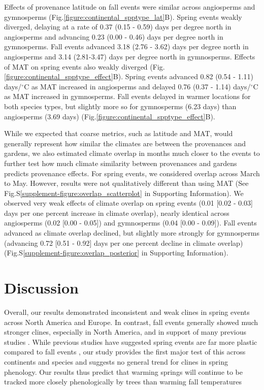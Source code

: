 \documentclass{article}
\begin{document}
Effects of provenance latitude on fall events were similar across angiosperms and gymnosperms (Fig.\ref{figure:continental_spptype_lat}B). Spring events weakly diverged, delaying at a rate of 0.37 (0.15 - 0.59) days per degree north in angiosperms and advancing 0.23 (0.00 - 0.46) days per degree north in gymnosperms. Fall events advanced 3.18 (2.76 - 3.62) days per degree north in angiosperms and 3.14 (2.81-3.47) days per degree north in gymnosperms.
Effects of MAT on spring events also weakly diverged (Fig.\ref{figure:continental_spptype_effect}B). Spring events advanced 0.82 (0.54 - 1.11) days/$^{\circ}$C as MAT increased in angiosperms and delayed 0.76 (0.37 - 1.14) days/$^{\circ}$C as MAT increased in gymnosperms. Fall events delayed in warmer locations for both species types, but slightly more so for gymnosperms (6.23 days) than angiosperms (3.69 days) (Fig.\ref{figure:continental_spptype_effect}B).

While we expected that coarse metrics, such as latitude and MAT, would generally represent how similar the climates are between the provenances and gardens, we also estimated climate overlap in months much closer to the events to further test how much climate similarity between provenances and gardens predicts provenance effects. For spring events, we considered overlap across March to May. However, results were not qualitatively different than using MAT (See Fig.S\ref{supplement-figure:overlap_scatterplot} in Supporting Information). We observed very weak effects of climate overlap on spring events (0.01 [0.02 - 0.03] days per one percent increase in climate overlap), nearly identical across angiosperms (0.02 [0.00 - 0.05]) and gymnosperms (0.04 [0.00 - 0.09]). Fall events advanced as climate overlap declined, but slightly more strongly for gymnosperms (advancing 0.72 [0.51 - 0.92] days per one percent decline in climate overlap) (Fig.S\ref{supplement-figure:overlap_posterior} in Supporting Information).


\section{Discussion}

Overall, our results demonstrated inconsistent and weak clines in spring events across North America and Europe. In contrast, fall events generally showed much stronger clines, especially in North America, and in support of many previous studies \citep{AitkenBemmels16, Alberto13}. While previous studies have suggested spring events are far more plastic compared to fall events \citep{Li97,farmer93,mimura07}, our study provides the first major test of this across continents and species and suggests no general trend for clines in spring phenology. Our results thus predict that warming springs will continue to be tracked more closely phenologically by trees than warming fall temperatures \citep{IPCC22}
\end{document}

